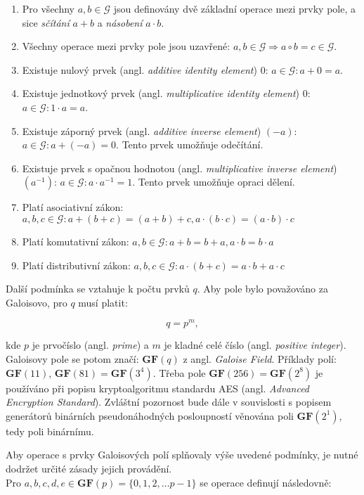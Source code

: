 \begin{enumerate}[i]
\item Pro všechny $a,b \in \mathcal{G}$ jsou definovány dvě základní operace mezi prvky pole, a sice \textsl{sčítání} $a + b$ a \textsl{násobení} $a \cdot b$.
\item Všechny operace mezi prvky pole jsou uzavřené: $a,b \in \mathcal{G} \Rightarrow a \circ b = c \in \mathcal{G}$.
\item Existuje nulový prvek (angl. \textsl{additive identity element}) $0$: $a\in \mathcal{G}: a+0=a$.
\item Existuje jednotkový prvek (angl. \textsl{multiplicative identity element}) $0$: $a\in \mathcal{G}: 1 \cdot a=a$.
\item Existuje záporný prvek (angl. \textsl{additive inverse element}) $(-a)$: $a\in \mathcal{G}: a+(-a)=0$. Tento prvek umožňuje odečítání.
\item Existuje prvek s opačnou hodnotou (angl. \textsl{multiplicative inverse element}) $(a^{-1})$: $a\in \mathcal{G}: a \cdot a^{-1}=1$. Tento prvek umožňuje opraci dělení.
\item Platí asociativní zákon: $a,b,c\in \mathcal{G}: a+(b+c)=(a+b)+c, a\cdot(b\cdot c)=(a\cdot b)\cdot c$
\item Platí komutativní zákon: $a,b\in \mathcal{G}: a+b=b+a, a\cdot b = b\cdot a$
\item Platí distributivní zákon: $a,b,c\in \mathcal{G}: a\cdot(b+c)=a\cdot b+a\cdot c$
\end{enumerate}

 Další podmínka se vztahuje k počtu prvků $q$. Aby pole bylo považováno za Galoisovo, pro $q$ musí platit:

 \begin{equation}
 q =  p^{m}, \label{eq_GF_num_q}
\end{equation}

kde $p$ je prvočíslo (angl. \textsl{prime}) a $m$ je kladné celé číslo (angl. \textsl{positive integer}). Galoisovy pole se potom značí: $\mathbf{GF}(q)$ z angl. \textsl{Galoise Field}. Příklady polí: $\mathbf{GF}(11)$, $\mathbf{GF}(81)=\mathbf{GF}(3^{4})$. Třeba pole $\mathbf{GF}(256)=\mathbf{GF}(2^8)$ je používáno při popisu kryptoalgoritmu standardu AES (angl. \textsl{Advanced Encryption Standard}). Zvláštní pozornost bude dále v souvislosti s popisem generátorů binárních pseudonáhodných posloupností věnována poli $\mathbf{GF}(2^1)$, tedy poli binárnímu.

\vspace{0.35in}
\marginpar{\textcolor{txt_blue}{Aritmetika Galoisových polí}} 
Aby operace s prvky Galoisových polí splňovaly výše uvedené podmínky, je nutné dodržet určité zásady jejich provádění.
\\ Pro $a,b,c,d,e\in \mathbf{GF}(p) = \{ 0,1,2, \ldots p-1\}$ se operace definují následovně:

